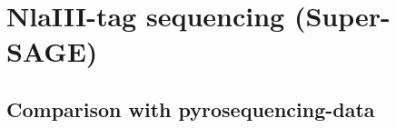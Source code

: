 
\chapter{NlaIII-tag sequencing
  (Super-SAGE)} %



\ifpdf
    \graphicspath{{X/figures/PNG/}{X/figures/PDF/}{X/figures/}}
\else
    \graphicspath{{X/figures/EPS/}{X/figures/}}
\fi


\section{Comparison with pyrosequencing-data}




